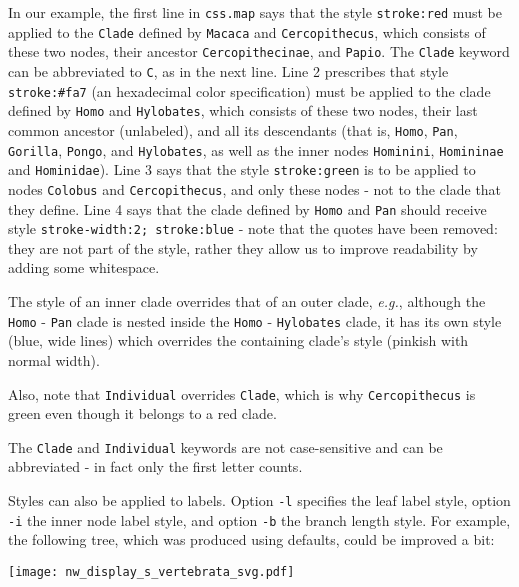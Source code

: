In our example, the first line in \texttt{css.map} says that the style
\texttt{stroke:red} must be applied to the \texttt{Clade} defined by
\texttt{Macaca} and \texttt{Cercopithecus}, which consists of these two nodes,
their ancestor \texttt{Cercopithecinae}, and \texttt{Papio}. The \texttt{Clade}
keyword can be abbreviated to \texttt{C}, as in the next line. Line 2
prescribes that style \texttt{stroke:\#fa7} (an \svg{} hexadecimal color
specification) must be applied to the clade defined by \texttt{Homo} and
\texttt{Hylobates}, which consists of these two nodes, their last common
ancestor (unlabeled), and all its descendants (that is, \texttt{Homo},
\texttt{Pan}, \texttt{Gorilla}, \texttt{Pongo}, and \texttt{Hylobates}, as well
as the inner nodes \texttt{Hominini}, \texttt{Homininae} and
\texttt{Hominidae}). Line 3 says that the style \texttt{stroke:green} is to be applied to nodes \texttt{Colobus} and \texttt{Cercopithecus}, and only these nodes - not to the clade that they define. 
Line 4 says that the clade defined by \texttt{Homo} and
\texttt{Pan} should receive style \texttt{stroke-width:2;~stroke:blue} - note
that the quotes have been removed: they are not part of the style, rather they
allow us to improve readability by adding some whitespace.

The style of an inner clade overrides that of an outer clade, \textit{e.g.},
although the \texttt{Homo} - \texttt{Pan} clade is nested inside the
\texttt{Homo} - \texttt{Hylobates} clade, it has its own style (blue, wide
lines) which overrides the containing clade's style (pinkish with normal
width).

Also, note that \texttt{Individual} overrides \texttt{Clade}, which is why
\texttt{Cercopithecus} is green even though it belongs to a red clade.

The \texttt{Clade} and \texttt{Individual} keywords are not case-sensitive and
can be abbreviated - in fact only the first letter counts.

Styles can also be applied to labels. Option \texttt{-l} specifies the leaf
label style, option \texttt{-i} the inner node label style, and option
\texttt{-b} the branch length style. For example, the following tree, which was
produced using defaults, could be improved a bit:


\begin{center}
  \texttt{[image: nw\_display\_s\_vertebrata\_svg.pdf]}
\end{center}

